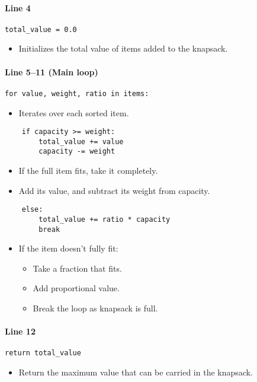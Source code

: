 \documentclass[14pt]{extarticle}
\begin{document}
\paragraph{Line 4}
\begin{verbatim}
total_value = 0.0
\end{verbatim}
\begin{itemize}
    \item Initializes the total value of items added to the knapsack.
\end{itemize}

\paragraph{Line 5–11 (Main loop)}
\begin{verbatim}
for value, weight, ratio in items:
\end{verbatim}
\begin{itemize}
    \item Iterates over each sorted item.
\end{itemize}

\begin{verbatim}
    if capacity >= weight:
        total_value += value
        capacity -= weight
\end{verbatim}
\begin{itemize}
    \item If the full item fits, take it completely.
    \item Add its value, and subtract its weight from capacity.
\end{itemize}

\begin{verbatim}
    else:
        total_value += ratio * capacity
        break
\end{verbatim}
\begin{itemize}
    \item If the item doesn't fully fit:
    \begin{itemize}
        \item Take a fraction that fits.
        \item Add proportional value.
        \item Break the loop as knapsack is full.
    \end{itemize}
\end{itemize}

\paragraph{Line 12}
\begin{verbatim}
return total_value
\end{verbatim}
\begin{itemize}
    \item Return the maximum value that can be carried in the knapsack.
\end{itemize}
\end{document}
